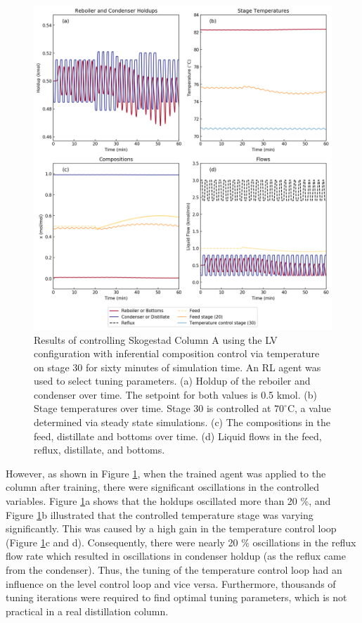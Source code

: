 \begin{figure}[p]
  \includegraphics[width=\textwidth]{gfx/Chapter05/20200424_trained_policy_sixty_minutes.png}
  \caption{Results of controlling Skogestad Column A using the LV configuration with inferential composition control via temperature on stage 30 for sixty minutes of simulation time. An RL agent was used to select tuning parameters. (a) Holdup of the reboiler and condenser over time. The setpoint for both values is 0.5 kmol. (b) Stage temperatures over time. Stage 30 is controlled at $70^{\circ}$C, a value determined via steady state simulations. (c) The compositions in the feed, distillate and bottoms over time. (d) Liquid flows in the feed, reflux, distillate, and bottoms.}
  \label{trained_policy}
\end{figure} 

However, as shown in Figure \ref{trained_policy}, when the trained agent was applied to the column after training, there were significant oscillations in the controlled variables. Figure \ref{trained_policy}a shows that the holdups oscillated more than 20 \%, and Figure \ref{trained_policy}b illustrated that the controlled temperature stage was varying significantly. This was caused by a high gain in the temperature control loop (Figure \ref{trained_policy}c and d). Consequently, there were nearly 20 \% oscillations in the reflux flow rate which resulted in oscillations in condenser holdup (as the reflux came from the condenser). Thus, the tuning of the temperature control loop had an influence on the level control loop and vice versa. Furthermore, thousands of tuning iterations were required to find optimal tuning parameters, which is not practical in a real distillation column.

